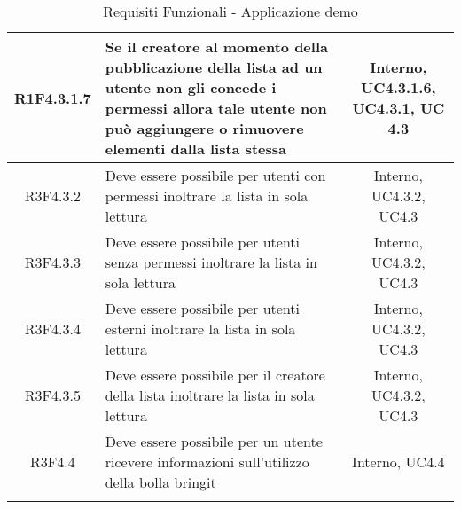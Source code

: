 \begin{longtable}{|c|>{\centering}m{7cm}|c|}
			\hline
			R1F4.3.1.7 & Se il creatore al momento della pubblicazione della lista ad un utente non gli concede i permessi allora tale utente non può aggiungere o rimuovere elementi dalla lista stessa & Interno, UC4.3.1.6, UC4.3.1, UC 4.3 \\
			\hline
			R3F4.3.2 & Deve essere possibile per utenti con permessi inoltrare la lista in sola lettura & Interno, UC4.3.2, UC4.3\\
			\hline
			R3F4.3.3 & Deve essere possibile per utenti senza permessi inoltrare la lista in sola lettura & Interno, UC4.3.2, UC4.3\\
			\hline
			R3F4.3.4 & Deve essere possibile per utenti esterni inoltrare la lista in sola lettura & Interno, UC4.3.2, UC4.3\\
			\hline
			R3F4.3.5 & Deve essere possibile per il creatore della lista inoltrare la lista in sola lettura & Interno, UC4.3.2, UC4.3\\
			\hline
			R3F4.4 & Deve essere possibile per un utente ricevere informazioni sull'utilizzo della bolla bringit & Interno, UC4.4\\
			\hline
\caption[Requisiti Funzionali - Applicazione demo]{Requisiti Funzionali - Applicazione demo}
\label{tabella: Requisiti Funzionali - Applicazione demo}
\end{longtable}
\endgroup
\clearpage